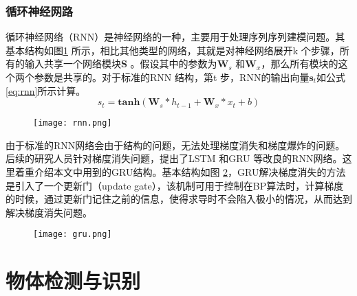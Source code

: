 \subsubsection{循环神经网路}

循环神经网络（RNN）是神经网络的一种，主要用于处理序列序列建模问题。其基本结构如图\ref{fig:rnn} 所示，相比其他类型的网络，其就是对神经网络展开k 个步骤，所有的输入共享一个网络模块\textbf{S} 。假设其中的参数为$\mathbf{W}_s$ 和$\mathbf{W}_x$，那么所有模块的这个两个参数是共享的。对于标准的RNN 结构，第t 步，RNN的输出向量$\mathbf{s}_t$如公式\ref{eq:rnn}所示计算。
\begin{equation}\label{eq:rnn}
    s_t = \mathbf{tanh}(\mathbf{W}_s*h_{t-1}+\mathbf{W}_x*x_{t}+b)
\end{equation}
\begin{figure}[htpb]
	\centering
	\texttt{[image: rnn.png]}
    \caption{}
	\vspace*{-3.5mm}
	\label{fig:rnn}
\end{figure}
由于标准的RNN网络会由于结构的问题，无法处理梯度消失和梯度爆炸的问题。后续的研究人员针对梯度消失问题，提出了LSTM\cite{hochreiter1997long} 和GRU\cite{cho2014learning} 等改良的RNN网络。这里着重介绍本文中用到的GRU结构。基本结构如图
\ref{fig:gru}，GRU解决梯度消失的方法是引入了一个更新门（update gate），该机制可用于控制在BP算法时，计算梯度的时候，通过更新门记住之前的信息，使得求导时不会陷入极小的情况，从而达到解决梯度消失问题。
\begin{figure}[htpb]
	\centering
	\texttt{[image: gru.png]}
    \caption{}
	\vspace*{-3.5mm}
	\label{fig:gru}
\end{figure}


\section{物体检测与识别}

